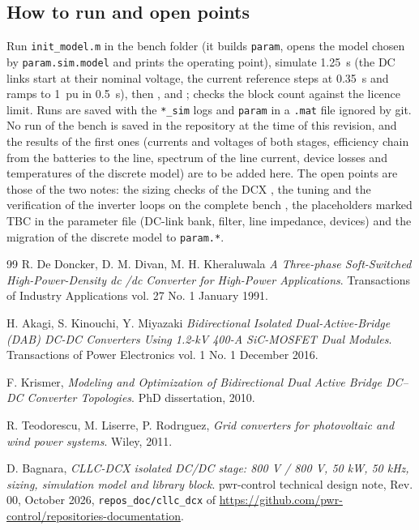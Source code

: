 \documentclass[12pt,a4paper]{scrartcl}
\begin{document}
\begin{onehalfspace}
\subsection{How to run and open points}
\label{sec:bench2026_run}
Run \texttt{init\_model.m} in the bench folder (it builds \texttt{param}, opens the model chosen by \texttt{param.sim.model} and prints the operating point), simulate \SI{1.25}{\second} (the DC links start at their nominal voltage, the current reference steps at \SI{0.35}{\second} and ramps to \SI{1}{pu} in \SI{0.5}{\second}), then ,  and ;  checks the block count against the licence limit. Runs are saved with the \texttt{*\_sim} logs and \texttt{param} in a \texttt{.mat} file ignored by git. No run of the bench is saved in the repository at the time of this revision, and the results of the first ones (currents and voltages of both stages, efficiency chain from the batteries to the line, spectrum of the line current, device losses and temperatures of the discrete model) are to be added here. The open points are those of the two notes: the sizing checks of the DCX \cite{cllc_dcx_doc}, the tuning and the verification of the inverter loops on the complete bench \cite{spinv_doc}, the placeholders marked TBC in the parameter file (DC-link bank, filter, line impedance, devices) and the migration of the discrete model to \texttt{param.*}.

\begin{thebibliography}{99}
	R. De Doncker, D. M. Divan, M. H. Kheraluwala \emph{A Three-phase Soft-Switched High-Power-Density dc /dc Converter for High-Power Applications}. Transactions of Industry Applications vol. 27 No. 1 January 1991.

	H. Akagi, S. Kinouchi, Y. Miyazaki \emph{Bidirectional Isolated Dual-Active-Bridge (DAB) DC-DC Converters Using 1.2-kV 400-A SiC-MOSFET Dual Modules}. Transactions of Power Electronics vol. 1 No. 1 December 2016.

	F. Krismer, \emph{Modeling and Optimization of Bidirectional Dual Active Bridge DC–DC Converter Topologies}. PhD dissertation, 2010.

	R. Teodorescu, M. Liserre, P. Rodrıguez, \emph{Grid converters for photovoltaic and wind power systems}. Wiley, 2011.

	D. Bagnara, \emph{CLLC-DCX isolated DC/DC stage: 800 V / 800 V, 50 kW, 50 kHz, sizing, simulation model and library block}. pwr-control technical design note, Rev. 00, October 2026, \texttt{repos\_doc/cllc\_dcx} of \url{https://github.com/pwr-control/repositories-documentation}.


\end{thebibliography}
\end{onehalfspace}
\end{document}
